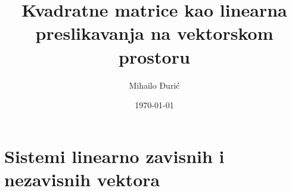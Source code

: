 \documentclass{article}
\title{Kvadratne matrice kao linearna preslikavanja na vektorskom prostoru}
\author{Mihailo Đurić}
\date{\today}
\begin{document}
\maketitle
\tableofcontents
\newpage

\section{Sistemi linearno zavisnih i nezavisnih vektora}
\end{document}
